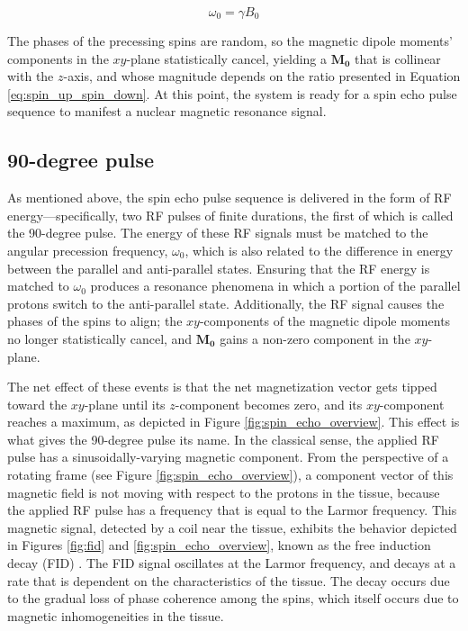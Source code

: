 \documentclass[12pt]{article} %
\renewcommand{\vec}[1]{\mathbf{#1}}
\begin{document}
\begin{equation}
\omega_{0} = \gamma B_{0}
\label{eq:larmor}
\end{equation}

The phases of the precessing spins are random, so the magnetic dipole moments' components in the $xy$-plane statistically cancel, yielding a $\vec{M_{0}}$ that is collinear with the $z$-axis, and whose magnitude depends on the ratio presented in Equation \ref{eq:spin_up_spin_down}. At this point, the system is ready for a spin echo pulse sequence to manifest a nuclear magnetic resonance signal.

\subsection{90-degree pulse}
As mentioned above, the spin echo pulse sequence is delivered in the form of RF energy---specifically, two RF pulses of finite durations, the first of which is called the 90-degree pulse. The energy of these RF signals must be matched to the angular precession frequency, $\omega_{0}$, which is also related to the difference in energy between the parallel and anti-parallel states. Ensuring that the RF energy is matched to $\omega_{0}$ produces a resonance phenomena in which a portion of the parallel protons switch to the anti-parallel state. Additionally, the RF signal causes the phases of the spins to align; the $xy$-components of the magnetic dipole moments no longer statistically cancel, and $\vec{M_{0}}$ gains a non-zero component in the $xy$-plane.

The net effect of these events is that the net magnetization vector gets tipped toward the $xy$-plane until its $z$-component becomes zero, and its $xy$-component reaches a maximum, as depicted in Figure \ref{fig:spin_echo_overview}. This effect is what gives the 90-degree pulse its name. In the classical sense, the applied RF pulse has a sinusoidally-varying magnetic component. From the perspective of a rotating frame (see Figure \ref{fig:spin_echo_overview}), a component vector of this magnetic field is not moving with respect to the protons in the tissue, because the applied RF pulse has a frequency that is equal to the Larmor frequency. This magnetic signal, detected by a coil near the tissue, exhibits the behavior depicted in Figures \ref{fig:fid} and \ref{fig:spin_echo_overview}, known as the free induction decay (FID) \cite{bushberg2002}. The FID signal oscillates at the Larmor frequency, and decays at a rate that is dependent on the characteristics of the tissue. The decay occurs due to the gradual loss of phase coherence among the spins, which itself occurs due to magnetic inhomogeneities in the tissue.
\end{document}
